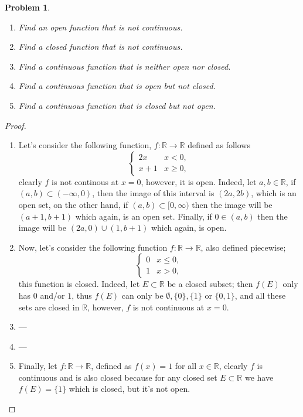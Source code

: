 \documentclass[11pt]{article}
\newtheorem{problem}{Problem}
\newtheorem{proof}{Proof}
\begin{document}
\begin{problem}
\begin{enumerate}
	\item Find an open function that is not continuous.
	\item Find a closed function that is not continuous.
	\item Find a continuous function that is neither open nor closed.
	\item Find a continuous function that is open but not closed.
	\item Find a continuous function that is closed but not open.
\end{enumerate}
\end{problem}
\begin{proof}
\begin{enumerate}
\item Let's consider the following function, $f:\mathbb{R}\rightarrow\mathbb{R}$ defined as follows 
\[ 
\begin{cases} 
      2x  & x < 0, \\
      x+1 & x \geq 0,
\end{cases}
\]
clearly $f$ is not continous at $x=0$, however, it is open. Indeed, let $a, b\in\mathbb{R}$, if $(a,b)\subset(-\infty,0)$, then the image of this interval is $(2a,2b)$, which is an open set, on the other hand, if $(a,b)\subset[0,\infty)$ then the image will be $(a+1,b+1)$ which again, is an open set. Finally, if $0\in(a,b)$ then the image will be $(2a,0)\cup (1,b+1)$ which again, is open.
\item Now, let's consider the following function $f:\mathbb{R}\rightarrow\mathbb{R}$, also defined piecewise;
\[ 
\begin{cases} 
      0 & x \leq 0, \\
      1 & x > 0,
\end{cases}
\]
this function is closed. Indeed, let $E\subset\mathbb{R}$ be a closed subset; then $f(E)$ only has $0$ and/or $1$, thus $f(E)$ can only be $\emptyset, \{0\}, \{1\}$ or $\{0,1\}$, and all these sets are closed in $\mathbb{R}$, however, $f$ is not continuous at $x=0$.
\item ---
\item ---
\item Finally, let $f:\mathbb{R}\rightarrow\mathbb{R}$, defined as $f(x)=1$ for all $x\in \mathbb{R}$, clearly $f$ is continuous and is also closed because for any closed set $E\subset\mathbb{R}$ we have $f(E)=\{1\}$ which is closed, but it's not open.
\end{enumerate}
\end{proof}
\end{document}
